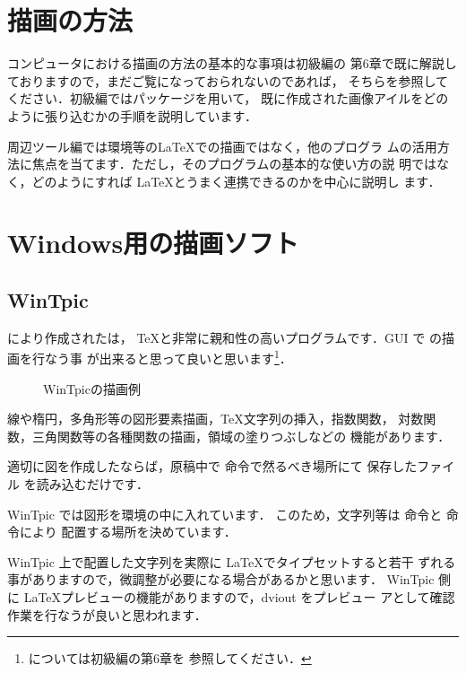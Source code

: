 \section{描画の方法}

コンピュータにおける描画の方法の基本的な事項は初級編の
第6章で既に解説しておりますので，まだご覧になっておられないのであれば，
そちらを参照してください．初級編ではパッケージを用いて，
既に作成された画像アイルをどのように張り込むかの手順を説明しています．

周辺ツール編では環境等の\LaTeX での描画ではなく，他のプログラ
ムの活用方法に焦点を当てます．ただし，そのプログラムの基本的な使い方の説
明ではなく，どのようにすれば \LaTeX とうまく連携できるのかを中心に説明し
ます．



\section{Windows用の描画ソフト}

\subsection{WinTpic}

により作成されたは，
\TeX と非常に親和性の高いプログラムです．GUI で \Tpic の描画を行なう事
が出来ると思って良いと思います\footnote{\Tpic については初級編の第6章を
参照してください．}．


\begin{figure}
 \centering
 
 \caption{WinTpicの描画例}
\end{figure}

線や楕円，多角形等の図形要素描画，\TeX 文字列の挿入，指数関数，
対数関数，三角関数等の各種関数の描画，領域の塗りつぶしなどの
機能があります．

適切に図を作成したならば，原稿中で  命令で然るべき場所にて
保存したファイル  を読み込むだけです．

WinTpic では図形を環境の中に入れています．
このため，文字列等は 命令と 命令により
配置する場所を決めています．

WinTpic 上で配置した文字列を実際に \LaTeX でタイプセットすると若干
ずれる事がありますので，微調整が必要になる場合があるかと思います．
WinTpic 側に \LaTeX プレビューの機能がありますので，dviout をプレビュー
アとして確認作業を行なうが良いと思われます．



